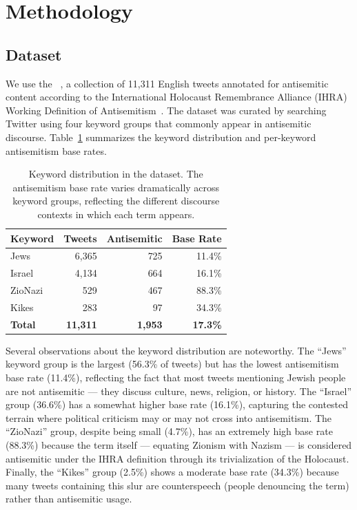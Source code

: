 \section{Methodology}
\label{sec:methodology}

\subsection{Dataset}
\label{sec:dataset}

We use the \dataset{}~\citep{jikeli2024goldstandard}, a collection of 11,311 English tweets annotated for antisemitic content according to the International Holocaust Remembrance Alliance (IHRA) Working Definition of Antisemitism~\citep{ihra2016working}. The dataset was curated by searching Twitter using four keyword groups that commonly appear in antisemitic discourse. Table~\ref{tab:keyword_dist} summarizes the keyword distribution and per-keyword antisemitism base rates.

\begin{table}[h]
\centering
\caption{Keyword distribution in the \dataset{} dataset. The antisemitism base rate varies dramatically across keyword groups, reflecting the different discourse contexts in which each term appears.}
\label{tab:keyword_dist}
\begin{tabular}{lrrr}
\toprule
\textbf{Keyword} & \textbf{Tweets} & \textbf{Antisemitic} & \textbf{Base Rate} \\
\midrule
Jews    & 6,365 & 725  & 11.4\% \\
Israel  & 4,134 & 664  & 16.1\% \\
ZioNazi &   529 & 467  & 88.3\% \\
Kikes   &   283 &  97  & 34.3\% \\
\midrule
\textbf{Total} & \textbf{11,311} & \textbf{1,953} & \textbf{17.3\%} \\
\bottomrule
\end{tabular}
\end{table}

Several observations about the keyword distribution are noteworthy. The ``Jews'' keyword group is the largest (56.3\% of tweets) but has the lowest antisemitism base rate (11.4\%), reflecting the fact that most tweets mentioning Jewish people are not antisemitic --- they discuss culture, news, religion, or history. The ``Israel'' group (36.6\%) has a somewhat higher base rate (16.1\%), capturing the contested terrain where political criticism may or may not cross into antisemitism. The ``ZioNazi'' group, despite being small (4.7\%), has an extremely high base rate (88.3\%) because the term itself --- equating Zionism with Nazism --- is considered antisemitic under the IHRA definition through its trivialization of the Holocaust. Finally, the ``Kikes'' group (2.5\%) shows a moderate base rate (34.3\%) because many tweets containing this slur are counterspeech (people denouncing the term) rather than antisemitic usage.

